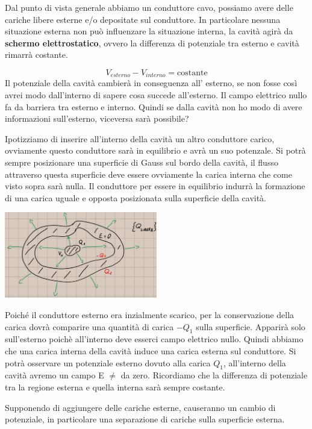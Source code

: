 \documentclass[a4paper, 12pt]{book}
\theoremstyle{plain}
\begin{document}
Dal punto di vista generale abbiamo un conduttore cavo, possiamo
avere delle cariche libere esterne e/o depositate sul conduttore.
In particolare nessuna situazione esterna non può influenzare 
la situazione interna, la cavità agirà da \textbf{schermo
elettrostatico}, ovvero la differenza di potenziale 
tra esterno e cavità rimarrà costante. 

\[V_{esterno} - V_{interno} = \textrm{costante}\]
Il potenziale della cavità cambierà in conseguenza all'
esterno, se non fosse così avrei modo dall'interno di 
sapere cosa succede all'esterno. Il campo elettrico nullo
fa da barriera tra esterno e interno. Quindi se dalla cavità
non ho modo di avere informazioni sull'esterno, viceversa
sarà possibile?

Ipotizziamo di inserire all'interno della cavità un altro conduttore
carico, ovviamente questo conduttore sarà in equilibrio 
e avrà un suo potenzale. Si potrà sempre posizionare 
una superficie di Gauss sul bordo della cavità, il 
flusso attraverso questa superficie deve essere ovviamente la 
carica interna che come visto sopra sarà nulla. Il conduttore
per essere in equilibrio indurrà la formazione di una 
carica uguale e opposta posizionata sulla superficie della
cavità.

\begin{center}
    \includegraphics[width=0.5\textwidth]{conduttore_inception.jpg}
\end{center}

Poiché il conduttore esterno era inzialmente scarico, 
per la conservazione della carica dovrà comparire
una quantità di carica $-Q_1$ sulla superficie. Apparirà 
solo sull'esterno poichè all'interno deve esserci 
campo elettrico nullo. Quindi abbiamo che una carica 
interna della cavità induce una carica esterna sul conduttore.
Si potrà osservare un potenziale esterno dovuto alla 
carica $Q_1$, all'interno della cavità avremo un campo 
E $\neq$ da zero. Ricordiamo che la differenza di potenziale 
tra la regione esterna e quella interna sarà sempre 
costante.

Supponendo di aggiungere delle cariche esterne, causeranno
un cambio di potenziale, in particolare una separazione 
di cariche sulla superficie esterna. 
\end{document}
